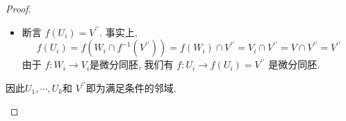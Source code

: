\documentclass[../main.tex]{subfiles}
\begin{document}
\begin{proof}
\begin{enumerate}
\begin{enumerate}
\begin{itemize}
            \item 断言 \(  f\left( U_{i} \right)= V^{\prime \prime}    \). 事实上,  \[
          f\left( U_{i} \right)= f\left( W_{i}\cap f^{-1} \left( V^{\prime \prime}  \right)   \right)= f\left( W_{i} \right)\cap V^{\prime \prime}= V_{i}\cap V^{\prime \prime}     = V\cap V^{\prime \prime} = V^{\prime \prime} 
            \]由于 \(  f:W_{i}\to V_{i}  \)是微分同胚, 我们有 \(  f: U_{i}\to f\left( U_{i} \right)= V^{\prime \prime}    \)  是微分同胚.
        \end{itemize}
        因此\(  U_1,\cdots ,U_{k}  \)和 \(  V^{\prime \prime}   \)即为满足条件的邻域.  
    \end{enumerate}
    
\end{enumerate}
\end{proof}
\end{document}
